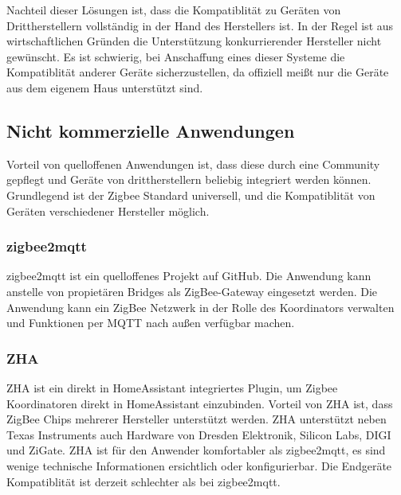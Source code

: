 Nachteil dieser Lösungen ist, dass die Kompatiblität zu Geräten von Drittherstellern vollständig in der Hand des Herstellers ist. In der Regel ist aus
wirtschaftlichen Gründen die Unterstützung konkurrierender Hersteller nicht gewünscht. Es ist schwierig, bei Anschaffung eines dieser Systeme die Kompatiblität
anderer Geräte sicherzustellen, da offiziell meißt nur die Geräte aus dem eigenem Haus unterstützt sind.

\subsection{Nicht kommerzielle Anwendungen}

Vorteil von quelloffenen Anwendungen ist, dass diese durch eine Community gepflegt und Geräte von drittherstellern beliebig integriert werden können.
Grundlegend ist der Zigbee Standard universell, und die Kompatiblität von Geräten verschiedener Hersteller möglich.

\subsubsection{zigbee2mqtt}

zigbee2mqtt \cite{z2m} ist ein quelloffenes Projekt auf GitHub. Die Anwendung kann anstelle von propietären Bridges als ZigBee-Gateway
eingesetzt werden. Die Anwendung kann ein ZigBee Netzwerk in der Rolle des Koordinators verwalten und Funktionen per MQTT nach außen verfügbar machen.

\subsubsection{ZHA}
ZHA ist ein direkt in HomeAssistant integriertes Plugin, um Zigbee Koordinatoren direkt in HomeAssistant einzubinden. Vorteil
von ZHA ist, dass ZigBee Chips mehrerer Hersteller unterstützt werden. ZHA unterstützt neben Texas Instruments auch Hardware von Dresden Elektronik,
Silicon Labs, DIGI und ZiGate. ZHA ist für den Anwender komfortabler als zigbee2mqtt, es sind wenige technische Informationen ersichtlich oder konfigurierbar.
Die Endgeräte Kompatiblität ist derzeit schlechter als bei zigbee2mqtt.







